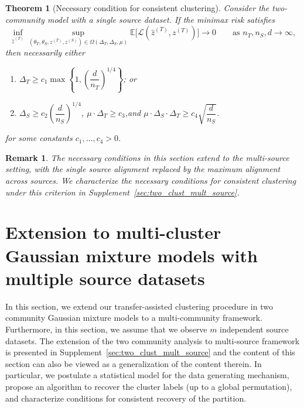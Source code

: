 \documentclass[10pt]{article}
\newtheorem{theorem}{Theorem}
\newtheorem{remark}{Remark}
\newcommand{\Ebb}{\mathbb E}
\newcommand{\wh}{\widehat}
\newcommand{\calL}{\mathcal L}
\newcommand{\trg}{T}
\newcommand{\thetaT}{\theta_{\trg}}
\newcommand{\nT}{n_{\trg}}
\newcommand{\ztar}{z^{(\trg)}}
\newcommand{\hatztar}{\wh{z}^{(\trg)}}
\newcommand{\DeltaT}{\Delta_{\trg}}
\newcommand{\src}{S}
\newcommand{\thetaS}{\theta_{\src}}
\newcommand{\nS}{n_{\src}}
\newcommand{\zsrc}{z^{(\src)}}
\newcommand{\DeltaS}{\Delta_{\src}}
\begin{document}
\begin{theorem}[Necessary condition for consistent clustering]
\label{thm:necessary_condition}
Consider the two-community model with a single source dataset.
If the minimax risk satisfies
\[
    \inf_{\hatztar}\sup_{(\thetaT,\thetaS,\ztar,\zsrc)\in\Omega(\DeltaT,\DeltaS,\mu)}
    \Ebb\bigl[\calL(\hatztar,\ztar)\bigr]\to 0
    \qquad\text{as }\nT,\nS,d\to\infty,
\]
then necessarily either
\begin{enumerate}[label=\emph{(\Alph*)}]
    \item $\displaystyle
          \DeltaT \ge c_1 \max\left\{1,\left(\dfrac{d}{\nT}\right)^{1/4}\right\}$;
          \quad\emph{or}
    \item $\displaystyle
          \DeltaS\ge c_2\left(\dfrac{d}{\nS}\right)^{1/4}$,\quad
          $\mu\cdot\DeltaT\ge c_3 $,\quad\emph{and}\quad
          $\displaystyle \mu\cdot\DeltaS\cdot\DeltaT\ge c_4\sqrt{\dfrac{d}{\nS}}$.
\end{enumerate}
for some constants $c_1,\ldots,c_4 >0$.
\end{theorem}
\begin{remark}
The necessary conditions in this section extend to the multi-source setting,
with the single source alignment replaced by the maximum alignment across
sources. We characterize the necessary conditions for consistent clustering
under this criterion in Supplement~\ref{sec:two_clust_mult_source}.
\end{remark}

\section{Extension to multi-cluster Gaussian mixture models with multiple source datasets}
\label{sec:mult_clust_mult_source}
In this section, we extend our transfer-assisted clustering procedure in two community Gaussian mixture models to a multi-community framework. Furthermore, in this section, we assume that we observe $m$ independent source datasets. The extension of the two community analysis to multi-source framework is presented in Supplement~\ref{sec:two_clust_mult_source} and the content of this section can also be viewed as a generalization of the content therein. In particular, we postulate a statistical model for the data generating mechanism, propose an algorithm to recover the cluster labels (up to a global permutation), and characterize conditions for consistent recovery of the partition. 
\end{document}
